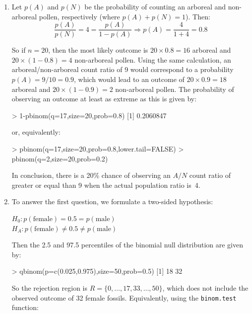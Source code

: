 \begin{enumerate}

\item Let $p(A)$ and $p(N)$ be the probability of counting an arboreal
  and non-arboreal pollen, respectively (where $p(A)+p(N)=1$). Then:
  \[
  \frac{p(A)}{p(N)} = 4 = \frac{p(A)}{1-p(A)}
  \Rightarrow p(A) = \frac{4}{1+4} = 0.8
  \]

  So if $n=20$, then the most likely outcome is $20\times{0.8}=16$
  arboreal and $20\times{(1-0.8)}=4$ non-arboreal pollen. Using the
  same calculation, an arboreal/non-arboreal count ratio of 9 would
  correspond to a probability $p(A)=9/10=0.9$, which would lead to an
  outcome of $20\times{0.9}=18$ arboreal and $20\times{(1-0.9)}=2$
  non-arboreal pollen. The probability of observing an outcome at
  least as extreme as this is given by:

\begin{console}
> 1-pbinom(q=17,size=20,prob=0.8)
[1] 0.2060847
\end{console}

or, equivalently:

\begin{console}
> pbinom(q=17,size=20,prob=0.8,lower.tail=FALSE)
> pbinom(q=2,size=20,prob=0.2)
\end{console}

In conclusion, there is a 20\% chance of observing an $A/N$ count
ratio of greater or equal than 9 when the actual population ratio
is~4.
  
\item To answer the first question, we formulate a two-sided
  hypothesis:

  $H_0: p(\mbox{female}) = 0.5 = p(\mbox{male})$\\
  $H_{\!A}: p(\mbox{female}) \neq 0.5 \neq p(\mbox{male})$

  Then the 2.5 and 97.5 percentiles of the binomial null distribution
  are given by:

\begin{console}
> qbinom(p=c(0.025,0.975),size=50,prob=0.5)
[1] 18 32
\end{console}

So the rejection region is $R=\{0,\ldots,17,33,\ldots,50\}$, which
does not include the observed outcome of 32 female
fossils. Equivalently, using the \texttt{binom.test} function:
  


\end{enumerate}
